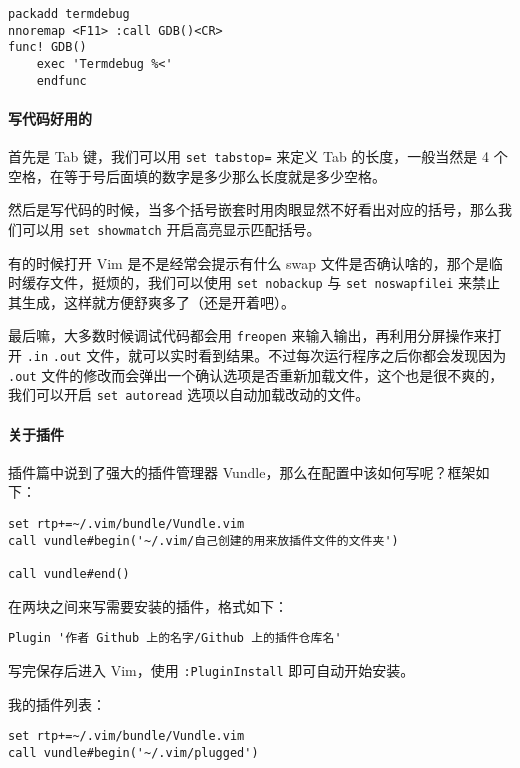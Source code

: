 {{\begin{verbatim}
packadd termdebug
nnoremap <F11> :call GDB()<CR>
func! GDB()
    exec 'Termdebug %<'
    endfunc       
\end{verbatim}

\paragraph{写代码好用的}

首先是 Tab 键，我们可以用 \texttt{set tabstop=} 来定义 Tab 的长度，一般当然是 4 个空格，在等于号后面填的数字是多少那么长度就是多少空格。

然后是写代码的时候，当多个括号嵌套时用肉眼显然不好看出对应的括号，那么我们可以用 \texttt{set showmatch} 开启高亮显示匹配括号。

有的时候打开 Vim 是不是经常会提示有什么 swap 文件是否确认啥的，那个是临时缓存文件，挺烦的，我们可以使用 \texttt{set nobackup} 与 \texttt{set noswapfilei} 来禁止其生成，这样就方便舒爽多了（还是开着吧）。

最后嘛，大多数时候调试代码都会用 \texttt{freopen} 来输入输出，再利用分屏操作来打开 \texttt{.in} \texttt{.out} 文件，就可以实时看到结果。不过每次运行程序之后你都会发现因为 \texttt{.out} 文件的修改而会弹出一个确认选项是否重新加载文件，这个也是很不爽的，我们可以开启 \texttt{set autoread} 选项以自动加载改动的文件。

\paragraph{关于插件}

插件篇中说到了强大的插件管理器 Vundle，那么在配置中该如何写呢？框架如下：

\begin{verbatim}
set rtp+=~/.vim/bundle/Vundle.vim
call vundle#begin('~/.vim/自己创建的用来放插件文件的文件夹')

call vundle#end()
\end{verbatim}

在两块之间来写需要安装的插件，格式如下：

\begin{verbatim}
Plugin '作者 Github 上的名字/Github 上的插件仓库名'
\end{verbatim}

写完保存后进入 Vim，使用 \texttt{:PluginInstall} 即可自动开始安装。

我的插件列表：

\begin{verbatim}
set rtp+=~/.vim/bundle/Vundle.vim
call vundle#begin('~/.vim/plugged')


\end{verbatim}}}
